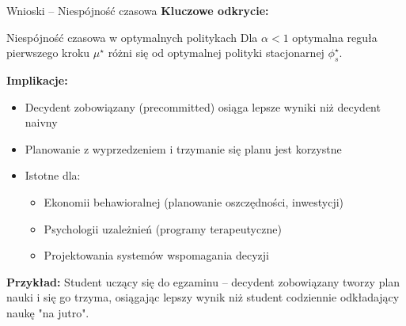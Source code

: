 \begin{frame}{Wnioski -- Niespójność czasowa}
\textbf{Kluczowe odkrycie:}

\begin{block}{Niespójność czasowa w optymalnych politykach}
Dla $\alpha < 1$ optymalna reguła pierwszego kroku $\mu^\star$ różni się od optymalnej polityki stacjonarnej $\phi_s^\star$.
\end{block}

\vspace{0.5em}
\textbf{Implikacje:}
\begin{itemize}
    \item Decydent zobowiązany (precommitted) osiąga lepsze wyniki niż decydent naivny
    \item Planowanie z wyprzedzeniem i trzymanie się planu jest korzystne
    \item Istotne dla:
    \begin{itemize}
        \item Ekonomii behawioralnej (planowanie oszczędności, inwestycji)
        \item Psychologii uzależnień (programy terapeutyczne)
        \item Projektowania systemów wspomagania decyzji
    \end{itemize}
\end{itemize}

\vspace{0.5em}
\textbf{Przykład:} Student uczący się do egzaminu -- decydent zobowiązany tworzy plan nauki i się go trzyma, osiągając lepszy wynik niż student codziennie odkładający naukę "na jutro".
\end{frame}

